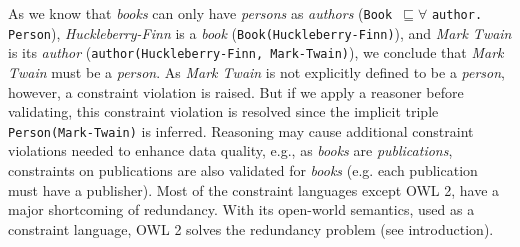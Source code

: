 \documentclass{llncs}
\newcommand{\ms}[1]{\texttt{#1}}
\newcommand{\tb}[1]{\todo[size=\small, color=green!40]{\textbf{Thomas:} #1}}
\newenvironment{DL}{
  \vspace{0cm}
  \begin{tabular}{r l}

}{
  \end{tabular}
}
\begin{document}

As we know that \emph{books} can only have \emph{persons} as \emph{authors} (\ms{Book $\sqsubseteq \forall$} \ms{author.} \ms{Person}), 
{\em Huckleberry-Finn} is a \emph{book}  (\ms{Book(Huckleberry-Finn)}), 
and \emph{Mark Twain} is its \emph{author} (\ms{author(Huckleberry-Finn, Mark-Twain)}),
we conclude that \emph{Mark Twain} must be a \emph{person}.
As \emph{Mark Twain} is not explicitly defined to be a \emph{person}, however, a constraint violation is raised.
But if we apply a reasoner before validating, this constraint violation is resolved since the implicit triple \ms{Person(Mark-Twain)} is inferred. 
Reasoning may cause additional constraint violations needed to enhance data quality, e.g., as \emph{books} are \emph{publications}, constraints on publications are also validated for \emph{books} (e.g. each publication must have a publisher).
Most of the constraint languages except OWL 2, have a major shortcoming of redundancy.
With its open-world semantics, used as a constraint language, OWL 2 solves the redundancy problem (see introduction). 
\end{document}
